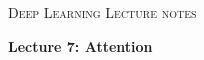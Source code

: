 \documentclass[11pt]{article}
\begin{document}
{\small\scshape Deep Learning \textperiodcentered{} Lecture notes}\par
{\LARGE\bfseries Lecture 7: Attention\par}



\end{document}
